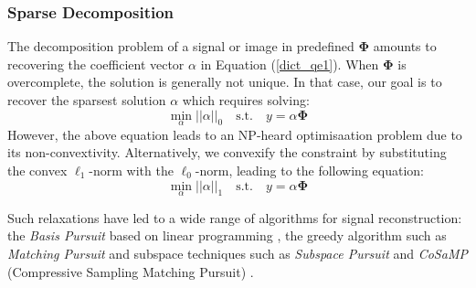 \subsubsection{Sparse Decomposition}
\label{BSS_sparse_decomp}
The decomposition problem of a signal or image in predefined $\mathbf{\Phi}$ amounts to recovering the coefficient vector $\alpha$ in Equation (\ref{dict_qe1}). When $\mathbf{\Phi}$ is overcomplete, the solution is generally not unique. In that case, our goal is to recover the sparsest solution $\alpha$ which requires solving:
\begin{equation}
    \min_{\alpha}||\alpha||_0 \quad \text{s.t.} \quad y = \alpha \mathbf{\Phi}
\end{equation}
However, the above equation leads to an NP-heard optimisaation problem due to its non-convextivity. Alternatively, we convexify the constraint by substituting the convex $\ell_1$-norm with the $\ell_0$-norm, leading to the following equation:
\begin{equation}
    \min_{\alpha} ||\alpha||_1 \quad \text{s.t.} \quad y = \alpha \mathbf{\Phi}
    \label{l1_sparse}
\end{equation}

Such relaxations have led to a wide range of algorithms for signal reconstruction: the \textit{Basis Pursuit} based on linear programming  \cite{BPAtomicDcomp}, the greedy algorithm such as \textit{Matching Pursuit} \cite{Mallat_Zhang1993} and subspace techniques such as \textit{Subspace Pursuit} \cite{WdaiSP} and \textit{CoSaMP} (Compressive
Sampling Matching Pursuit) \cite{CoSaMP2008}.


